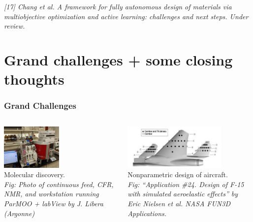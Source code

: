 \documentclass[aspectratio=169]{beamer}
\begin{document}
\begin{frame}
\vfill

{\tiny\it
[17] Chang et al.
A framework for fully autonomous design of materials via multiobjective optimization and active learning: challenges and next steps.
Under review.\\
}

\end{frame}

\section{Grand challenges + some closing thoughts}

\begin{frame}\frametitle{Grand Challenges}

\begin{columns}
\begin{column}{0.5\textwidth}
\begin{center}
\includegraphics[height=6em]{lab_setup.jpg}\\
{\small
Molecular discovery.\\
}
{\tiny \sl
Fig: Photo of continuous feed, CFR, NMR, and workstation running
ParMOO + labView
by J. Libera (Argonne)\\
}
\end{center}
\end{column}
\begin{column}{0.5\textwidth}
\begin{center}
\includegraphics[height=6em]{../img/probs/nasa-f15.png}\\
{\small
Nonparametric design of aircraft.\\
}
{\tiny \sl
Fig: ``Application \#24. Design of F-15 with simulated aeroelastic effects''
by Eric Nielsen et al.
NASA FUN3D Applications.\\
}
\end{center}
\end{column}
\end{columns}
\begin{center}

\end{center}
\end{frame}
\end{document}
